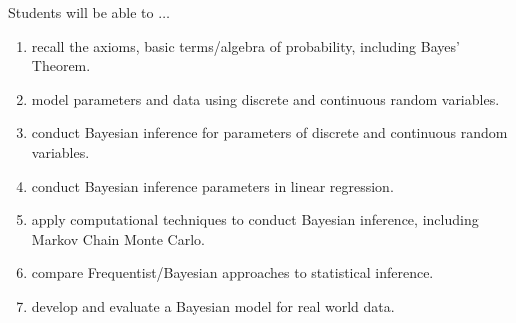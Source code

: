 \documentclass[11pt,onecolumn]{article}
\begin{document}
Students will be able to $\ldots$

\begin{enumerate}
  \itemsep0em

  \item recall the axioms, basic terms/algebra of probability, including Bayes' Theorem.
\item model parameters and data using discrete and continuous random variables.
\item conduct Bayesian inference for parameters of discrete and continuous random variables.
\item conduct Bayesian inference parameters in linear regression.
\item apply computational techniques to conduct Bayesian inference, including Markov Chain Monte Carlo.
\item compare Frequentist/Bayesian approaches to statistical inference.
\item develop and evaluate a Bayesian model for real world data.

\end{enumerate}
\end{document}
